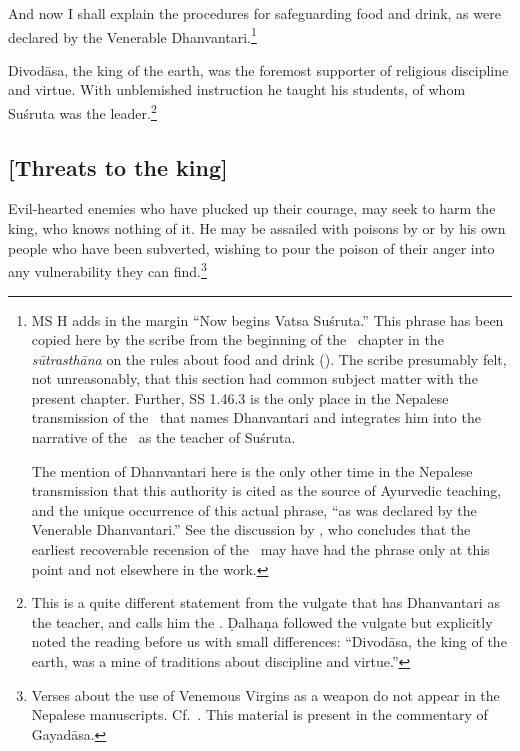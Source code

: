 \begin{translation}
 \item[1--2]  And now I shall explain the procedures for safeguarding food and
drink, as were declared by the Venerable Dhanvantari.\footnote{MS H adds in the
margin  “Now begins Vatsa Suśruta.”  This phrase
has been copied here by the scribe from the beginning of the \SS\ chapter in the
\emph{sūtrasthāna} on the rules about food and drink ().  The
scribe presumably felt, not unreasonably, that this section had common subject
matter with the present chapter.  Further, SS 1.46.3 is the only place in the Nepalese 
transmission of the \SS\ that names Dhanvantari and integrates him into the narrative of the 
\SS\ as the teacher of Suśruta. 
  
 The mention of Dhanvantari here is the only other time in the Nepalese
transmission that this authority is cited as the source of Ayurvedic teaching, and the unique 
occurrence of this actual phrase, “as was declared by the Venerable Dhanvantari.”
See the discussion by \citet[28--32]{kleb-2021b}, who concludes that the earliest
recoverable recension of the \SS\ may have had the phrase only at this point and
not elsewhere in the work.}
 
 \item[3] 

 Divodāsa, the king of the earth, was the foremost supporter of religious
discipline and virtue. With unblemished instruction he taught his students, of
whom Suśruta was the leader.\footnote{This is a quite different statement from
the vulgate \citep[559]{susr-trikamji3} that has Dhanvantari as the teacher, and
calls him the .  Ḍalhaṇa followed the vulgate but
explicitly noted the reading before us with small differences:  “Divodāsa, the king of the earth, was a mine of
traditions about discipline and virtue.”}

\subsection{[Threats to the king]}

\item[4--5]  

Evil-hearted enemies who have plucked up their courage, may seek to harm the king,
who knows nothing of it.  He may be assailed with poisons by or by his own people
who have been subverted, wishing to pour the poison of their anger into any
vulnerability they can find.\footnote{Verses about the use of Venemous Virgins as a weapon
do not appear in the Nepalese manuscripts. Cf.\ \cite[81\,f., 132]{wuja-2003}.  This material 
is present in the commentary of Gayadāsa.} 


\end{translation}

